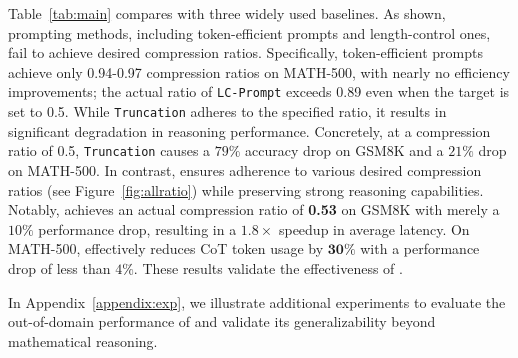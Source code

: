 Table~\ref{tab:main} compares \method with three widely used baselines. As shown, prompting methods, including token-efficient prompts and length-control ones, fail to achieve desired compression ratios. Specifically, token-efficient prompts achieve only 0.94-0.97 compression ratios on MATH-500, with nearly no efficiency improvements; the actual ratio of \texttt{LC-Prompt} exceeds 0.89 even when the target is set to 0.5. While \texttt{Truncation} adheres to the specified ratio, it results in significant degradation in reasoning performance. Concretely, at a compression ratio of 0.5, \texttt{Truncation} causes a $79\%$ accuracy drop on GSM8K and a $21\%$ drop on MATH-500. In contrast, \method ensures adherence to various desired compression ratios (see Figure~\ref{fig:allratio}) while preserving strong reasoning capabilities. Notably, \method achieves an actual compression ratio of \textbf{0.53} on GSM8K with merely a $10\%$ performance drop, resulting in a $\bm{1.8}\times$ speedup in average latency. On MATH-500, \method effectively reduces CoT token usage by $\bm{30}\%$ with a performance drop of less than $4\%$. These results validate the effectiveness of \method.

In Appendix~\ref{appendix:exp}, we illustrate additional experiments to evaluate the out-of-domain performance of \method and validate its generalizability beyond mathematical reasoning.